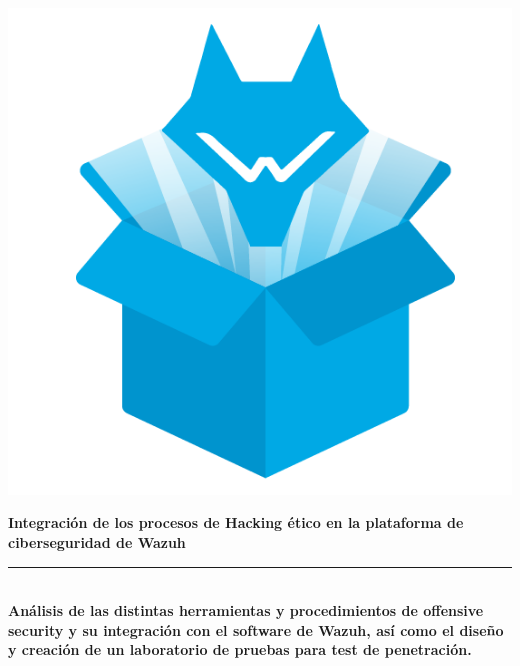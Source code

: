 \begin{titlepage}
 
 
\setlength{\centeroffset}{-0.5\oddsidemargin}
\addtolength{\centeroffset}{0.5\evensidemargin}
\thispagestyle{empty}

\noindent\hspace*{\centeroffset}\begin{minipage}{\textwidth}

\centering

% 

\includegraphics{imagenes/logo.png} 


{\Huge\bfseries Integración de los procesos de Hacking ético en la plataforma de ciberseguridad de Wazuh\\
}
\noindent\rule[-1ex]{\textwidth}{3pt}\\[3.5ex]
{\large\bfseries Análisis de las distintas herramientas y procedimientos de offensive security y su integración con el software de Wazuh, así como el diseño y creación de un laboratorio de pruebas para test de penetración.\\[4cm]}
\end{minipage}


\end{titlepage}
